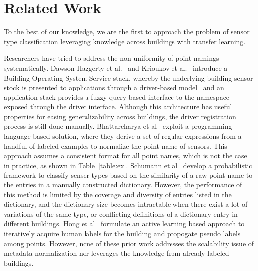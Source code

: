 \section{Related Work}
To the best of our knowledge, we are the first to approach the problem of sensor type classification leveraging knowledge across buildings with transfer learning.

Researchers have tried to address the non-uniformity of point namings systematically.
Dawson-Haggerty et al.~\cite{boss} and Krioukov et al.~\cite{bas}
introduce a Building Operating System Service stack, whereby
the underlying building sensor stock is presented to applications through a driver-based model \
and an application stack provides a fuzzy-query based interface to the namespace exposed 
through the driver interface.
Although this architecture has useful properties for easing generalizability across
buildings, the driver registration process is still done manually. 
Bhattarcharya et al~\cite{arka} exploit a programming language based solution, 
where they derive a set of regular expressions from a handful of labeled examples 
to normalize the point name of sensors. 
This approach assumes a consistent format for all point names, which is not the case in practice, as shown in Table~\ref{table:ex}. 
Schumann et al~\cite{ibm} develop a probabilistic framework to classify sensor types 
based on the similarity of a raw point name to the entries in a manually constructed dictionary. 
However, the performance of this method is limited by the coverage and diversity of entries listed in the dictionary, and the dictionary size becomes intractable when there exist a lot of variations of the same type, or conflicting definitions of a dictionary entry in different buildings.
Hong et al~\cite{cikm} formulate an active learning based approach to iteratively 
acquire human labels for the building and propogate pseudo labels among points.
However, none of these prior work addresses the scalability issue of metadata 
normalization nor leverages the knowledge from already labeled buildings.


